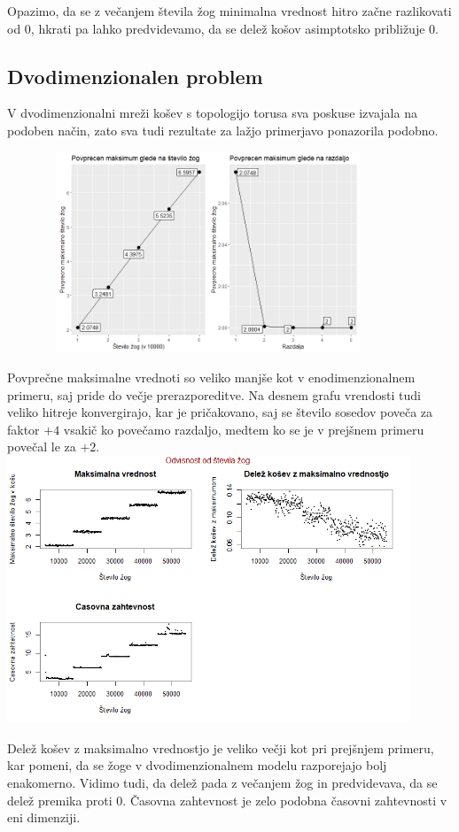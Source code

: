 \documentclass[a4paper, 11pt]{article}
\begin{document}
Opazimo, da se z večanjem števila žog minimalna vrednost hitro začne razlikovati od 0, hkrati pa lahko predvidevamo, da se delež košov asimptotsko približuje $0$. 
\bigbreak

\subsection{Dvodimenzionalen problem}
V dvodimenzionalni mreži košev s topologijo torusa sva poskuse izvajala na podoben način, zato sva tudi rezultate za lažjo primerjavo ponazorila podobno.

\includegraphics[width=12cm, height=6cm]{povprecje_2dim1.png}

Povprečne maksimalne vrednoti so veliko manjše kot v enodimenzionalnem primeru, saj pride do večje prerazporeditve. Na desnem grafu vrendosti tudi veliko hitreje konvergirajo, kar je pričakovano, saj se število sosedov poveča za faktor $+4$ vsakič ko povečamo razdaljo, 
medtem ko se je v prejšnem primeru povečal le za $+2$.
\bigbreak
\includegraphics[width=12cm, height= 8cm]{dim2_glede_na_stevilo_zog1.png}

Delež košev z maksimalno vrednostjo je veliko večji kot pri prejšnjem primeru, kar pomeni, 
da se žoge v dvodimenzionalnem modelu razporejajo bolj enakomerno. Vidimo tudi, da 
delež pada z večanjem žog in predvidevava, da se delež premika proti $0$. Časovna zahtevnost je zelo podobna časovni zahtevnosti v eni dimenziji.
\end{document}
